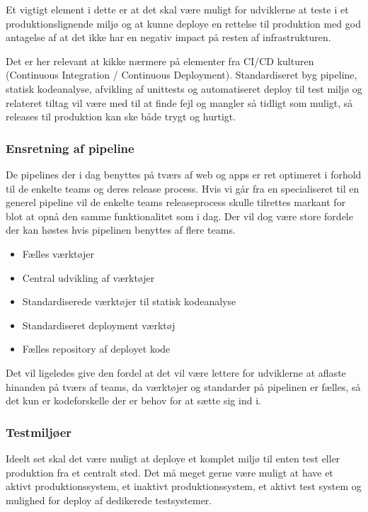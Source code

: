 \documentclass{article}
\begin{document}
Et vigtigt element i dette er at det skal være muligt for udviklerne at teste i et produktionslignende miljø og at kunne deploye en rettelse til produktion med god antagelse af at det ikke har en negativ impact på resten af infrastrukturen. 

Det er her relevant at kikke nærmere på elementer fra CI/CD kulturen (Continuous Integration / Continuous Deployment). Standardiseret byg pipeline, statisk kodeanalyse, afvikling af unittests og automatiseret deploy til test miljø og relateret tiltag vil være med til at finde fejl og mangler så tidligt som muligt, så releases til produktion kan ske både trygt og hurtigt.



\subsubsection{Ensretning af pipeline}
De pipelines der i dag benyttes på tværs af web og apps er ret optimeret i forhold til de enkelte teams og deres release process. Hvis vi går fra en specialiseret til en generel pipeline vil de enkelte teams releaseprocess skulle tilrettes markant for blot at opnå den samme funktionalitet som i dag. Der vil dog være store fordele der kan høstes hvis pipelinen benyttes af flere teams. 
\begin{itemize}
\item Fælles værktøjer
\item Central udvikling af værktøjer
\item Standardiserede værktøjer til statisk kodeanalyse
\item Standardiseret deployment værktøj
\item Fælles repository af deployet kode
\end{itemize}


Det vil ligeledes give den fordel at det vil være lettere for udviklerne at aflaste hinanden på tværs af teams, da værktøjer og standarder på pipelinen er fælles, så det kun er kodeforskelle der er behov for at sætte sig ind i.
 
\subsubsection{Testmiljøer}
Ideelt set skal det være muligt at deploye et komplet miljø til enten test eller produktion fra et centralt sted. Det må meget gerne være muligt at have et aktivt produktionssystem, et inaktivt produktionssystem, et aktivt test system og mulighed for deploy af dedikerede testsystemer. 
\end{document}

